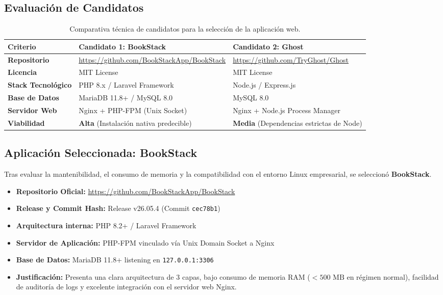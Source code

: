 \documentclass[12pt,a4paper]{article}
\begin{document}
\subsection{Evaluación de Candidatos}

\begin{table}[h!]
\centering
\small
{}
\begin{tabularx}{\textwidth}{|p{3cm}|X|X|}
\hline
\rowcolor{NavyPrimary} \color{white}\textbf{Criterio} & \color{white}\textbf{Candidato 1: BookStack} & \color{white}\textbf{Candidato 2: Ghost} \\ \hline
\textbf{Repositorio} & \url{https://github.com/BookStackApp/BookStack} & \url{https://github.com/TryGhost/Ghost} \\ \hline
\textbf{Licencia} & MIT License & MIT License \\ \hline
\textbf{Stack Tecnológico} & PHP 8.x / Laravel Framework & Node.js / Express.js \\ \hline
\textbf{Base de Datos} & MariaDB 11.8+ / MySQL 8.0 & MySQL 8.0 \\ \hline
\textbf{Servidor Web} & Nginx + PHP-FPM (Unix Socket) & Nginx + Node.js Process Manager \\ \hline
\textbf{Viabilidad} & \textbf{Alta} (Instalación nativa predecible) & \textbf{Media} (Dependencias estrictas de Node) \\ \hline
\end{tabularx}
\caption{Comparativa técnica de candidatos para la selección de la aplicación web.}
\label{tab:candidatos}
\end{table}

\subsection{Aplicación Seleccionada: BookStack}
Tras evaluar la mantenibilidad, el consumo de memoria y la compatibilidad con el entorno Linux empresarial, se seleccionó \textbf{BookStack}.

\begin{itemize}[leftmargin=1.5em, itemsep=2pt]
    \item \textbf{Repositorio Oficial:} \url{https://github.com/BookStackApp/BookStack}
    \item \textbf{Release y Commit Hash:} Release v26.05.4 (Commit \texttt{cec78b1})
    \item \textbf{Arquitectura interna:} PHP 8.2+ / Laravel Framework
    \item \textbf{Servidor de Aplicación:} PHP-FPM vinculado vía Unix Domain Socket a Nginx
    \item \textbf{Base de Datos:} MariaDB 11.8+ listening en \texttt{127.0.0.1:3306}
    \item \textbf{Justificación:} Presenta una clara arquitectura de 3 capas, bajo consumo de memoria RAM ($<500\text{ MB}$ en régimen normal), facilidad de auditoría de logs y excelente integración con el servidor web Nginx.
\end{itemize}
\end{document}
